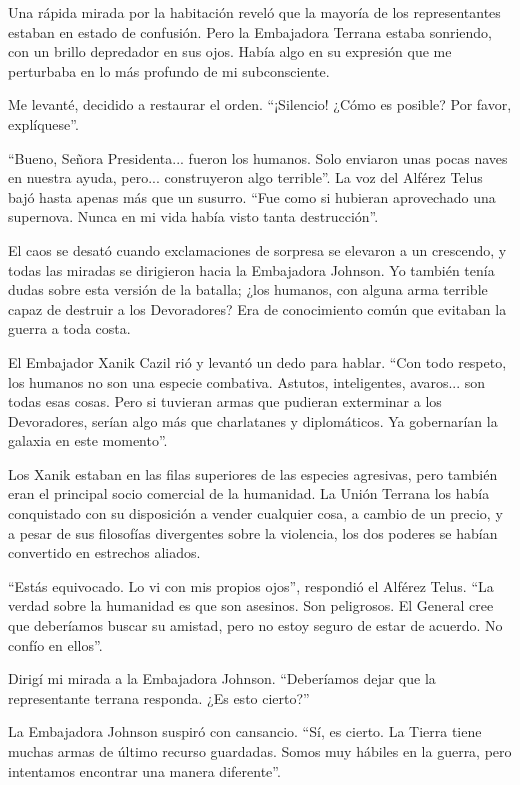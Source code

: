 \documentclass[spanish,12pt,a4paper,oneside,titlepage]{book}
\begin{document}
    Una rápida mirada por la habitación reveló que la mayoría de los representantes estaban en estado de confusión. Pero la Embajadora Terrana estaba sonriendo, con un brillo depredador en sus ojos. Había algo en su expresión que me perturbaba en lo más profundo de mi subconsciente.

    Me levanté, decidido a restaurar el orden. ``¡Silencio! ¿Cómo es posible? Por favor, explíquese''.

    ``Bueno, Señora Presidenta... fueron los humanos. Solo enviaron unas pocas naves en nuestra ayuda, pero... construyeron algo terrible''. La voz del Alférez Telus bajó hasta apenas más que un susurro. ``Fue como si hubieran aprovechado una supernova. Nunca en mi vida había visto tanta destrucción''.

    El caos se desató cuando exclamaciones de sorpresa se elevaron a un crescendo, y todas las miradas se dirigieron hacia la Embajadora Johnson. Yo también tenía dudas sobre esta versión de la batalla; ¿los humanos, con alguna arma terrible capaz de destruir a los Devoradores? Era de conocimiento común que evitaban la guerra a toda costa.

    El Embajador Xanik Cazil rió y levantó un dedo para hablar. ``Con todo respeto, los humanos no son una especie combativa. Astutos, inteligentes, avaros... son todas esas cosas. Pero si tuvieran armas que pudieran exterminar a los Devoradores, serían algo más que charlatanes y diplomáticos. Ya gobernarían la galaxia en este momento''.

    Los Xanik estaban en las filas superiores de las especies agresivas, pero también eran el principal socio comercial de la humanidad. La Unión Terrana los había conquistado con su disposición a vender cualquier cosa, a cambio de un precio, y a pesar de sus filosofías divergentes sobre la violencia, los dos poderes se habían convertido en estrechos aliados.

    ``Estás equivocado. Lo vi con mis propios ojos'', respondió el Alférez Telus. ``La verdad sobre la humanidad es que son asesinos. Son peligrosos. El General cree que deberíamos buscar su amistad, pero no estoy seguro de estar de acuerdo. No confío en ellos''.

    Dirigí mi mirada a la Embajadora Johnson. ``Deberíamos dejar que la representante terrana responda. ¿Es esto cierto?''

    La Embajadora Johnson suspiró con cansancio. ``Sí, es cierto. La Tierra tiene muchas armas de último recurso guardadas. Somos muy hábiles en la guerra, pero intentamos encontrar una manera diferente''.
\end{document}
